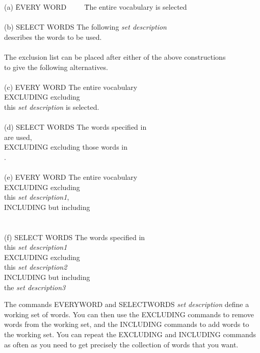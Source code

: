 \begin{tabbing}
(a)   \=EVERY WORD~~~~~\=The entire vocabulary is selected\\
\\
(b)   \>SELECT WORDS   \>The following {\em set description}\\
       \>describes the words to be used.\\
\\
The exclusion list can be placed after either of the above constructions\\
to give the following alternatives.\\
\\
(c)   \>EVERY WORD     \>The entire vocabulary\\
      \>EXCLUDING      \>excluding\\
      \>this {\em set description} is selected.\\
\\
(d)   \>SELECT WORDS   \>The words specified in\\
       are used,\\
      \>EXCLUDING      \>excluding those words in\\
      .\\
\\
(e)   \>EVERY WORD     \>The entire vocabulary\\
      \>EXCLUDING      \>excluding\\
      \>this {\em set description1},\\
      \>INCLUDING      \>but including\\
      \\
\\
(f)   \>SELECT WORDS   \>The words specified in\\
      \>this {\em set description1}\\
      \>EXCLUDING      \>excluding\\
      \>this {\em set description2}\\
      \>INCLUDING      \>but including\\
      \>the {\em set description3}
\end{tabbing}

The commands EVERYWORD and SELECTWORDS {\em set description} define
a working set of words. You can then use the EXCLUDING commands to
remove words from the working set, and the INCLUDING commands to
add words to the working set. You can repeat the EXCLUDING and
INCLUDING commands as often as you need to get precisely the
collection of words that you want.

